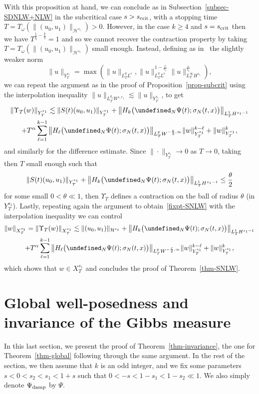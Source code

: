 \documentclass[10pt]{amsart}
\theoremstyle{definition}\newtheorem{defi}[theo]{Definition}\newtheorem{rema}[theo]{Remark}\newtheorem{exam}[theo]{Example}\newtheorem{exem}[theo]{Example}\newtheorem{nota}[theo]{Notation}
\newcommand{\scrit}{s_{\textup{crit}}}
\newcommand{\damp}{\textup{damp}}
\let\P= \undefined
\newcommand{\P}{\mathbf{P}}
\renewcommand{\H}{\mathcal{H}}
\newcommand{\al}{\alpha}
\newcommand{\eps}{\varepsilon}
\newcommand{\s}{\sigma}
\renewcommand{\o}{\omega}
\newcommand{\les}{\lesssim}
\begin{document}
With this proposition at hand, we can conclude as in Subsection~\ref{subsec-SDNLW+NLW} in the subcritical case $s>\scrit$, with a stopping time $T=T_\o(\|(u_0,u_1)\|_{\H^{s_1}})>0$. However, in the case $k\geq 4$ and $s=\scrit$ then we have $T^{\frac1{\widetilde{q}}-\frac{k}{q}} = 1$ and so we cannot recover the contraction property by taking $T=T_\o(\|(u_0,u_1)\|_{\H^{s_1}})$ small enough. Instead, defining as in~\cite{GKO} the slightly weaker norm
\begin{equation*}
\|u\|_{Y^{s_1}_T}= \max\left(\|u\|_{L^q_TL^r}, \|u\|_{L^q_TL^r}^{1-\frac{\eps}{s_1}}\|u\|_{L^{\infty}_TH^{s_1}}^{\frac{\eps}{s_1}}\right),
\end{equation*}
we can repeat the argument as in the proof of Proposition~\ref{prop-subcrit} using the interpolation inequality $\|u\|_{L^{q_1}_TW^{\eps,r_1}}\les \|u\|_{Y^{s_1}_T}$, to get
\begin{multline*}
\left\|\Upsilon_T(w)\right\|_{Y^{s_1}_T} \les \|S(t)(u_0,u_1)\|_{Y^{s_1}_T} + \big\|H_{k}\big(\P_N\Psi(t);\s_N(t,x)\big)\big\|_{L^1_TH^{s_1-1}}\\ + T^\al\sum_{\ell=1}^{k-1}\big\|H_{\ell}\big(\P_N\Psi(t);\s_N(t,x)\big)\big\|_{L^p_TW^{-\frac\eps2,\infty}}\|w\|_{Y^{s_1}_T}^{k-\ell}+ \|w\|_{Y^{s_1}_T}^k,
\end{multline*}
and similarly for the difference estimate. Since $\|\cdot\|_{Y^{s_1}_T}\rightarrow 0$ as $T\rightarrow 0$, taking then $T$ small enough such that
\begin{equation*}
\|S(t)(u_0,u_1)\|_{Y^{s_1}_T} + \big\|H_{k}\big(\P_N\Psi(t);\s_N(t,x)\big)\big\|_{L^1_TH^{s_1-1}} \leq \frac{\theta}2
\end{equation*}
for some small $0<\theta\ll 1$, then $\Upsilon_T$ defines a contraction on the ball of radius $\theta$ (in $Y^{s_1}_T$). Lastly, repeating again the argument to obtain~\eqref{fixpt-SNLW} with the interpolation inequality we can control
\begin{multline*}
\|w\|_{X^{s_1}_T}=\left\|\Upsilon_T(w)\right\|_{X^{s_1}_T}\les \|(u_0,u_1)\|_{\H^{s_1}} + \left\|H_{k}\big(\P_N\Psi(t);\s_N(t,x)\big)\right\|_{L^1_TH^{s_1-1}}\\ 
+ T^\al\sum_{\ell=1}^{k-1}\big\|H_{\ell}\big(\P_N\Psi(t);\s_N(t,x)\big)\big\|_{L^p_T W^{-\frac\eps2,\infty}}\|w\|_{Y^{s_1}_T}^{k-\ell}+ \|w\|_{Y^{s_1}_T}^k,
\end{multline*}
which shows that $w\in X^{s_1}_T$ and concludes the proof of Theorem~\ref{thm-SNLW}.


\section{Global well-posedness and invariance of the Gibbs measure}\label{sec-global}
In this last section, we present the proof of Theorem~\ref{thm-invariance}, the one for Theorem~\ref{thm-global} following through the same argument. In the rest of the section, we then assume that $k$ is an odd integer, and we fix some parameters $s<0<s_2<s_1<1+s$ such that $0<-s< 1-s_1 < 1-s_2 \ll 1$. We also simply denote $\Psi_\damp$ by $\Psi$.
\end{document}
